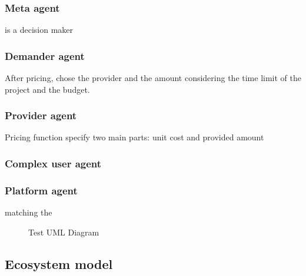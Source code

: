 \subsubsection{Meta agent} %
\label{ssub:meta_agent}
is a decision maker

\subsubsection{Demander agent} %
\label{ssub:demander_agent}
After pricing, chose the provider and the amount considering the time limit of the project and the budget.

\subsubsection{Provider agent} %
\label{ssub:provider_agent}
Pricing function specify two main parts:
unit cost and
provided amount

\subsubsection{Complex user agent} %
\label{ssub:complex_user_agent}


\subsubsection{Platform agent} %
\label{ssub:platform_agent}
matching the 
\begin{figure}

\caption{Test UML Diagram}

\end{figure}


\subsection{Ecosystem model} %
\label{sub:ecosystem model}


